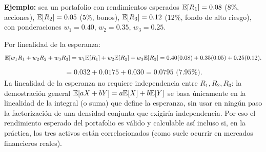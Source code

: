 \begin{solproblema}[prob:5c186f2]
	\textbf{Ejemplo:} sea un portafolio con rendimientos esperados $\mathbb{E}[R_1]=0.08$ (8\%, acciones), $\mathbb{E}[R_2]=0.05$ (5\%, bonos), $\mathbb{E}[R_3]=0.12$ (12\%, fondo de alto riesgo), con ponderaciones $w_1=0.40$, $w_2=0.35$, $w_3=0.25$.

	Por linealidad de la esperanza:
	\begin{align*}
		\mathbb{E}[w_1R_1+w_2R_2+w_3R_3] = w_1\mathbb{E}[R_1]+w_2\mathbb{E}[R_2]+w_3\mathbb{E}[R_3] = 0.40(0.08)+0.35(0.05)+0.25(0.12).
	\end{align*}
	\begin{align*}
		= 0.032+0.0175+0.030 = 0.0795 \text{ (7.95\%).}
	\end{align*}
	La linealidad de la esperanza no requiere independencia entre $R_1, R_2, R_3$: la demostración general $\mathbb{E}[aX+bY]=a\mathbb{E}[X]+b\mathbb{E}[Y]$ se basa únicamente en la linealidad de la integral (o suma) que define la esperanza, sin usar en ningún paso la factorización de una densidad conjunta que exigiría independencia. Por eso el rendimiento esperado del portafolio es válido y calculable así incluso si, en la práctica, los tres activos están correlacionados (como suele ocurrir en mercados financieros reales).
\end{solproblema}
